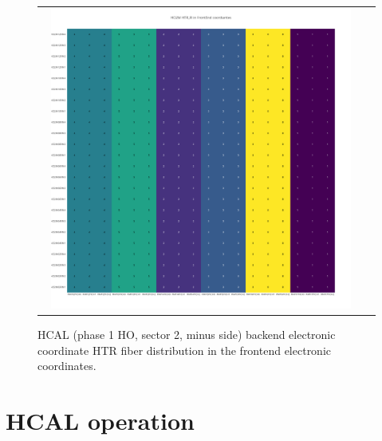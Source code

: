 \begin{figure}[htb]
 \begin{center}
  \begin{tabular}{cc}
   \includegraphics[angle=0,width=0.95\textwidth]{figures/appendix/HO2M_HTR_FI_in_FrontEnd.png}
  \end{tabular}
  \caption{HCAL (phase 1 HO, sector 2, minus side) backend electronic coordinate HTR fiber distribution in the frontend electronic coordinates.}
  \label{fig:lmapHO2MHTRFIFEC}
 \end{center}
\end{figure}
\clearpage

\section{HCAL operation}
